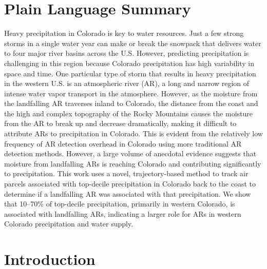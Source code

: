 \documentclass[draft]{agujournal2019}
\begin{document}
\section*{Plain Language Summary}
Heavy precipitation in Colorado is key to water resources. Just a few strong storms in a single water year can make or break the snowpack that delivers water to four major river basins across the U.S. However, predicting precipitation is challenging in this region because Colorado precipitation has high variability in space and time. One particular type of storm that results in heavy precipitation in the western U.S. is an atmospheric river (AR), a long and narrow region of intense water vapor transport in the atmosphere. However, as the moisture from the landfalling AR traverses inland to Colorado, the distance from the coast and the high and complex topography of the Rocky Mountains causes the moisture from the AR to break up and decrease dramatically, making it difficult to attribute ARs to precipitation in Colorado. This is evident from the relatively low frequency of AR detection overhead in Colorado using more traditional AR detection methods. However, a large volume of anecdotal evidence suggests that moisture from landfalling ARs is reaching Colorado and contributing significantly to precipitation. This work uses a novel, trajectory-based method to track air parcels associated with top-decile precipitation in Colorado back to the coast to determine if a landfalling AR was associated with that precipitation. We show that 10–70\% of top-decile precipitation, primarily in western Colorado, is associated with landfalling ARs, indicating a larger role for ARs in western Colorado precipitation and water supply.

%
%

\section{Introduction}
\label{intro}
\end{document}
